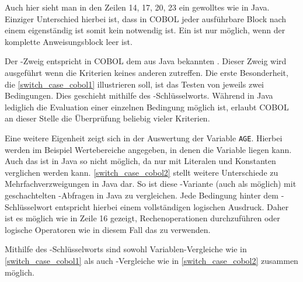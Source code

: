 Auch hier sieht man in den Zeilen 14, 17, 20, 23 ein gewolltes  wie in Java. Einziger Unterschied hierbei ist, dass in COBOL jeder ausführbare Block nach einem  eigenständig ist somit kein  notwendig ist. Ein  ist nur möglich, wenn der komplette Anweisungsblock leer ist. 

Der -Zweig entspricht in COBOL dem aus Java bekannten . Dieser Zweig wird ausgeführt wenn die Kriterien keines anderen zutreffen.
Die erste Besonderheit, die \autoref{switch_case_cobol1} illustrieren soll, ist das Testen von jeweils zwei Bedingungen. Dies geschieht mithilfe des -Schlüsselworts. Während in Java lediglich die Evaluation einer einzelnen Bedingung möglich ist, erlaubt COBOL an dieser Stelle die Überprüfung beliebig vieler Kriterien.

Eine weitere Eigenheit zeigt sich in der Auswertung der Variable \texttt{AGE}. Hierbei werden im Beispiel Wertebereiche angegeben, in denen die Variable liegen kann. Auch das ist in Java so nicht möglich, da nur mit Literalen und Konstanten verglichen werden kann.
\autoref{switch_case_cobol2} stellt weitere Unterschiede zu Mehrfachverzweigungen in Java dar. So ist diese -Variante (auch als  möglich) mit geschachtelten -Abfragen in Java zu vergleichen. Jede Bedingung hinter dem -Schlüsselwort entspricht hierbei einem vollständigen logischen Ausdruck. Daher ist es möglich wie in Zeile 16 gezeigt, Rechenoperationen durchzuführen oder logische Operatoren wie in diesem Fall das  zu verwenden. 

Mithilfe des -Schlüsselworts sind sowohl Variablen-Vergleiche wie in \autoref{switch_case_cobol1} als auch -Vergleiche wie in \autoref{switch_case_cobol2} zusammen möglich.